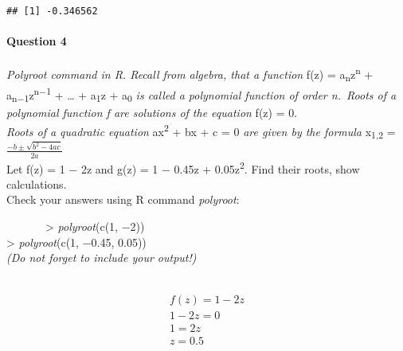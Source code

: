 \documentclass[
]{article}
\begin{document}
\begin{verbatim}
## [1] -0.346562
\end{verbatim}

\hfill\break
\hfill\break

\hypertarget{question-4}{%
\paragraph{Question 4}\label{question-4}}

\emph{Polyroot command in R. Recall from algebra, that a function} f(z)
= a\textsubscript{n}z\textsuperscript{n} +
a\textsubscript{n−1}z\textsuperscript{n−1} + \ldots{} +
a\textsubscript{1}z + a\textsubscript{0} \emph{is called a polynomial
function of order n.~Roots of a polynomial function f are solutions of
the equation} f(z) = 0.\\
\emph{Roots of a quadratic equation} ax\textsuperscript{2} + bx + c = 0
\emph{are given by the formula} x\textsubscript{1,2} =
\(\frac{−b ± \sqrt{b^2−4ac}}{2a}\)\\
Let f(z) = 1 − 2z and g(z) = 1 − 0.45z + 0.05z\textsuperscript{2}. Find
their roots, show calculations.\\
Check your answers using R command \emph{polyroot}:\\
\setlength{\leftskip}{2cm}

~~~~~~~\textgreater{} \emph{polyroot}(c(1, −2))\\
\hspace*{0.333em}\hspace*{0.333em}\hspace*{0.333em}\hspace*{0.333em}\hspace*{0.333em}\hspace*{0.333em}\hspace*{0.333em}\textgreater{}
\emph{polyroot}(c(1, −0.45, 0.05))\\
\hspace*{0.333em}\hspace*{0.333em}\hspace*{0.333em}\hspace*{0.333em}\hspace*{0.333em}\hspace*{0.333em}\hspace*{0.333em}\emph{(Do
not forget to include your output!)}

\setlength{\leftskip}{0cm}\\

\[
\begin{aligned}
f(z) = 1 - 2z\\
1-2z=0\\
1 = 2z\\
z = 0.5
\end{aligned}
\]
\end{document}
